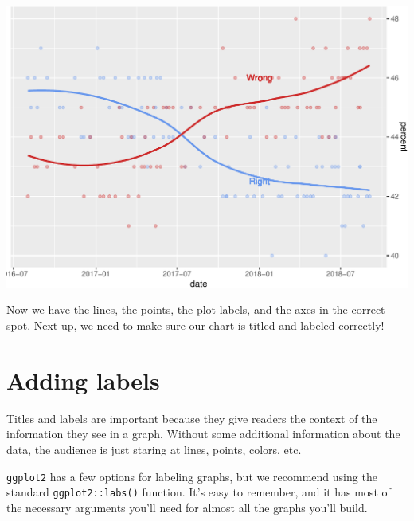 \documentclass[letterpaper,12pt,twoside,]{pinp}
\begin{document}
\begin{Shaded}
\begin{Highlighting}[]
\OtherTok{\textless{}{-}}\SpecialCharTok{+} 
\SpecialCharTok{::}\NormalTok{(} \NormalTok{)}
\end{Highlighting}
\end{Shaded}

\begin{center}\includegraphics{03-intro-to-ggplot2_files/figure-latex/ggp_brexit_global_colors_text_scale_y-1} \end{center}

Now we have the lines, the points, the plot labels, and the axes in the
correct spot. Next up, we need to make sure our chart is titled and
labeled correctly!

\hypertarget{adding-labels}{%
\section{Adding labels}\label{adding-labels}}

Titles and labels are important because they give readers the context of
the information they see in a graph. Without some additional information
about the data, the audience is just staring at lines, points, colors,
etc.

\texttt{ggplot2} has a few options for labeling graphs, but we recommend
using the standard \texttt{ggplot2::labs()} function. It's easy to
remember, and it has most of the necessary arguments you'll need for
almost all the graphs you'll build.
\end{document}
